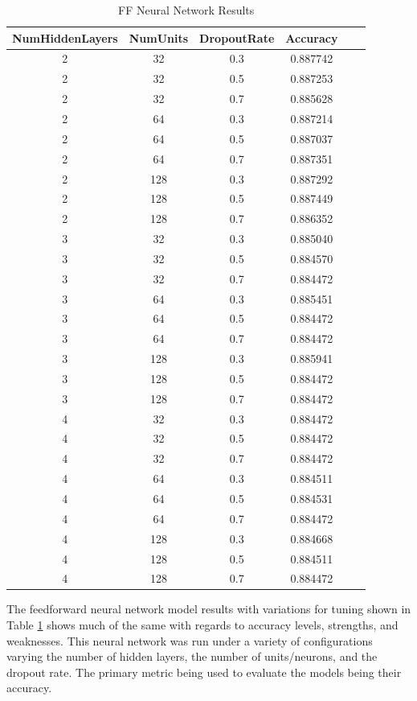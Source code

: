 \documentclass[12pt]{article}
\begin{document}
\begin{table}[htbp]
    \centering
    \caption{FF Neural Network Results}
    \begin{tabular}{cccccc}
        \toprule
        NumHiddenLayers & NumUnits & DropoutRate & Accuracy \\
        \midrule
        \rowcolor{green!25}2 & 32 & 0.3 & 0.887742 \\
        2 & 32 & 0.5 & 0.887253 \\
        2 & 32 & 0.7 & 0.885628 \\
        2 & 64 & 0.3 & 0.887214 \\
        2 & 64 & 0.5 & 0.887037 \\
        2 & 64 & 0.7 & 0.887351 \\
        2 & 128 & 0.3 & 0.887292 \\
        2 & 128 & 0.5 & 0.887449 \\
        2 & 128 & 0.7 & 0.886352 \\
        3 & 32 & 0.3 & 0.885040 \\
        3 & 32 & 0.5 & 0.884570 \\
        3 & 32 & 0.7 & 0.884472 \\
        3 & 64 & 0.3 & 0.885451 \\
        3 & 64 & 0.5 & 0.884472 \\
        3 & 64 & 0.7 & 0.884472 \\
        3 & 128 & 0.3 & 0.885941 \\
        3 & 128 & 0.5 & 0.884472 \\
        3 & 128 & 0.7 & 0.884472 \\
        4 & 32 & 0.3 & 0.884472 \\
        4 & 32 & 0.5 & 0.884472 \\
        4 & 32 & 0.7 & 0.884472 \\
        4 & 64 & 0.3 & 0.884511 \\
        4 & 64 & 0.5 & 0.884531 \\
        4 & 64 & 0.7 & 0.884472 \\
        4 & 128 & 0.3 & 0.884668 \\
        4 & 128 & 0.5 & 0.884511 \\
        4 & 128 & 0.7 & 0.884472 \\
        \bottomrule
    \end{tabular}
    \label{table:fFNeuralNetworkResults}
\end{table}

The feedforward neural network model results with variations for tuning shown in Table \ref{table:fFNeuralNetworkResults} shows much of the same with regards to accuracy levels, strengths, and weaknesses. This neural network was run under a variety of configurations varying the number of hidden layers, the number of units/neurons, and the dropout rate. The primary metric being used to evaluate the models being their accuracy.
\end{document}
